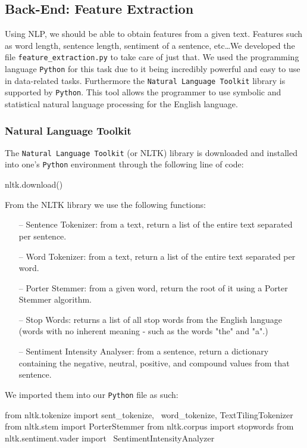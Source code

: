 \documentclass[runningheads]{llncs}
\begin{document}
\subsection{Back-End: Feature Extraction}

Using NLP, we should be able to obtain features from a given text. Features such as word length, sentence length, sentiment of a sentence, etc\ldots We developed the file \texttt{feature\_extraction.py} to take care of just that. We used the programming language \texttt{Python} for this task due to it being incredibly powerful and easy to use in data-related tasks. Furthermore the \texttt{Natural Language Toolkit} library is supported by \texttt{Python}. This tool allows the programmer to use symbolic and statistical natural language processing for the English language.

\subsubsection{Natural Language Toolkit}

The \texttt{Natural Language Toolkit} (or NLTK) library is downloaded and installed into one's \texttt{Python} environment through the following line of code:

\begin{python}
nltk.download()
\end{python}

From the NLTK library we use the following functions:
\begin{itemize}
    \item[--] Sentence Tokenizer: from a text, return a list of the entire text separated per sentence.
    \item[--] Word Tokenizer: from a text, return a list of the entire text separated per word.
    \item[--] Porter Stemmer: from a given word, return the root of it using a Porter Stemmer algorithm.
    \item[--] Stop Words: returns a list of all stop words from the English language (words with no inherent meaning - such as the words "the" and "a".)
    \item[--] Sentiment Intensity Analyser: from a sentence, return a dictionary containing the negative, neutral, positive, and compound values from that sentence.
\end{itemize}

We imported them into our \texttt{Python} file as such:

\begin{python}
from nltk.tokenize import sent_tokenize, \
word_tokenize, TextTilingTokenizer
from nltk.stem import PorterStemmer
from nltk.corpus import stopwords
from nltk.sentiment.vader import \ 
SentimentIntensityAnalyzer
\end{python}
\end{document}
